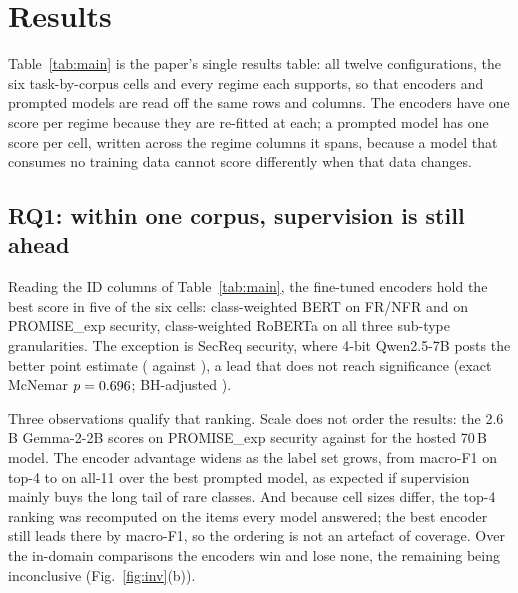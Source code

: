 \documentclass[conference]{IEEEtran}
\newcommand{\pex}{PROMISE\_exp}
\newcommand{\Fm}{macro-F1}
\begin{document}
\section{Results}
\label{sec:results}
Table~\ref{tab:main} is the paper's single results table: all twelve
configurations, the six task-by-corpus cells and every regime each supports, so
that encoders and prompted models are read off the same rows and columns. The
encoders have one score per regime because they are re-fitted at each; a prompted
model has one score per cell, written across the regime columns it spans, because
a model that consumes no training data cannot score differently when that data
changes.

\begin{table}[t]
\caption{\Fm{} for all twelve configurations, across every task, corpus and
regime. ID = in-domain, XP = cross-project, XD = cross-dataset. Best per column
in bold; ``--'' marks a cell below the reportability gate of
Section~\ref{sec:scoring}, or a regime that does not apply. A prompted model's
score is written once across the regimes of its cell, because it consumes no
training data and the regime cannot move it. Encoder cells are cross-validated
over all items ($n = \nNcellItems{}$ by task group); prompted cells are
stratified samples of them ($n = \nNpromptMin$--$\nNpromptMax$).}
\label{tab:main}
\centering

\end{table}

\subsection{RQ1: within one corpus, supervision is still ahead}
Reading the ID columns of Table~\ref{tab:main}, the fine-tuned encoders hold the
best score in five of the six cells: class-weighted BERT on FR/NFR and on \pex{}
security, class-weighted RoBERTa on all three sub-type granularities. The
exception is SecReq security, where 4-bit Qwen2.5-7B posts the better point
estimate (\nSecreqBestLLM{} against \nSecreqBestEnc), a lead that does not reach
significance (exact McNemar $p = 0.696$; BH-adjusted \nSecreqPBH).

Three observations qualify that ranking. Scale does not order the results: the
2.6\,B Gemma-2-2B scores \nGemmaSec{} on \pex{} security against \nLlamaSec{} for
the hosted 70\,B model. The encoder advantage widens as the label set grows, from
\nLeadFour{} \Fm{} on top-4 to \nLeadAll{} on all-11 over the best prompted
model, as expected if supervision mainly buys the long tail of rare classes. And
because cell sizes differ, the top-4 ranking was recomputed on the
\nNcommonFour{} items every model answered; the best encoder still leads there by
\nLeadFourCommon{} \Fm{}, so the ordering is not an artefact of coverage. Over
the \nNtestID{} in-domain comparisons the encoders win \nWinID{} and lose none,
the remaining \nTieID{} being inconclusive (Fig.~\ref{fig:inv}(b)).
\end{document}
